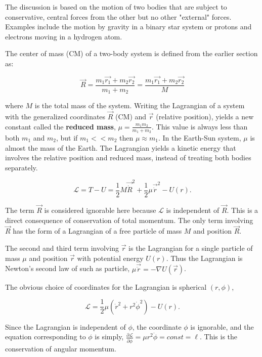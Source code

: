 
The discussion is based on the motion of two bodies that are subject to conservative, central forces from the other but no other "external" forces. Examples include the motion by gravity in a binary star system or protons and electrons moving in a hydrogen atom.

The center of mass (CM) of a two-body system is defined from the earlier section as:

\begin{equation*}
    \vec{R} = \frac{m_1 \vec{r_1} + m_2 \vec{r_2}}{m_1 + m_2} = \frac{m_1 \vec{r_1} + m_2 \vec{r_2}}{M}
\end{equation*}

\noindent where $M$ is the total mass of the system. Writing the Lagrangian of a system with the generalized coordinates $\vec{R}$ (CM) and $\vec{r}$ (relative position), yields a new constant called the {\bfseries reduced mass}, $\mu = \frac{m_1 m_2}{m_1 + m_2}$. This value is always less than both $m_1$ and $m_2$, but if $m_1 << m_2$ then $\mu \approx m_1$. In the Earth-Sun system, $\mu$ is almost the mass of the Earth. The Lagrangian yields a kinetic energy that involves the relative position and reduced mass, instead of treating both bodies separately.

\begin{equation*}
    \mathcal{L} = T-U = \frac{1}{2}M \vec{\dot{R}}^2 + \frac{1}{2}\mu \vec{\dot{r}}^2 - U(r).
\end{equation*}

The term $\vec{R}$ is considered ignorable here because $\mathcal{L}$ is independent of $\vec{R}$. This is a direct consequence of conservation of total momentum. The only term involving $\vec{R}$ has the form of a Lagrangian of a free particle of mass $M$ and position $\vec{R}$.

The second and third term involving $\vec{r}$ is the Lagrangian for a single particle of mass $\mu$ and position $\vec{r}$ with potential energy $U(r)$. Thus the Lagrangian is Newton's second law of such as particle, $\mu \vec{\ddot{r}} = -\nabla U(\vec{r})$.

The obvious choice of coordinates for the Lagrangian is spherical $(r,\phi)$,

\begin{equation*}
    \mathcal{L} = \frac{1}{2}\mu (\dot{r}^2 + r^2 \dot{\phi}^2) - U(r).
\end{equation*}

Since the Lagrangian is independent of $\phi$, the coordinate $\phi$ is ignorable, and the equation corresponding to $\phi$ is simply, $\frac{\partial \mathcal{L}}{\partial \dot{\phi}} = \mu r^2 \dot{\phi} = const = \ell$. This is the conservation of angular momentum.

